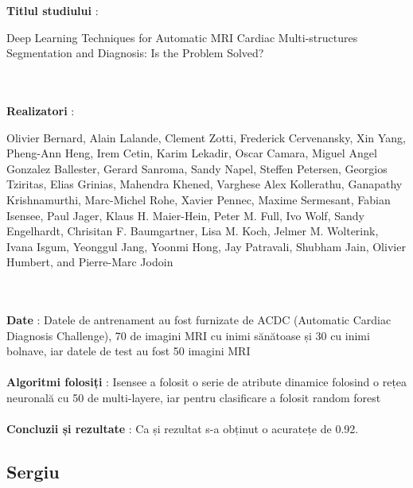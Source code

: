 \documentclass[a4papaer,12pt]{article}
\begin{document}
\textbf{Titlul studiului} : \begin{Large}
Deep Learning Techniques for Automatic MRI
Cardiac Multi-structures Segmentation and
Diagnosis: Is the Problem Solved?
\end{Large}
\\\\
\indent \textbf{Realizatori} : \begin{large}Olivier Bernard, Alain Lalande, Clement Zotti, Frederick Cervenansky, Xin Yang, Pheng-Ann Heng, Irem Cetin,
Karim Lekadir, Oscar Camara, Miguel Angel Gonzalez Ballester, Gerard Sanroma, Sandy Napel,
Steffen Petersen, Georgios Tziritas, Elias Grinias, Mahendra Khened, Varghese Alex Kollerathu,
Ganapathy Krishnamurthi, Marc-Michel Rohe, Xavier Pennec, Maxime Sermesant, Fabian Isensee, Paul Jager,
Klaus H. Maier-Hein, Peter M. Full, Ivo Wolf, Sandy Engelhardt, Chrisitan F. Baumgartner, Lisa M. Koch,
Jelmer M. Wolterink, Ivana Isgum, Yeonggul Jang, Yoonmi Hong, Jay Patravali, Shubham Jain, Olivier Humbert,
and Pierre-Marc Jodoin
\end{large}
\\\\
\indent \textbf{Date} : Datele de antrenament au fost furnizate de ACDC (Automatic Cardiac Diagnosis Challenge), 70 de imagini MRI cu inimi sănătoase și 30 cu inimi bolnave, iar datele de test au fost 50 imagini MRI 
\\\\
\indent \textbf{Algoritmi folosiți} : Isensee a folosit o serie de atribute dinamice folosind o rețea neuronală cu 50 de multi-layere, iar pentru clasificare a folosit random forest 
\\\\
\indent \textbf{Concluzii și rezultate} : Ca și rezultat s-a obținut o acuratețe de 0.92.


\subsection{Sergiu}
\end{document}
